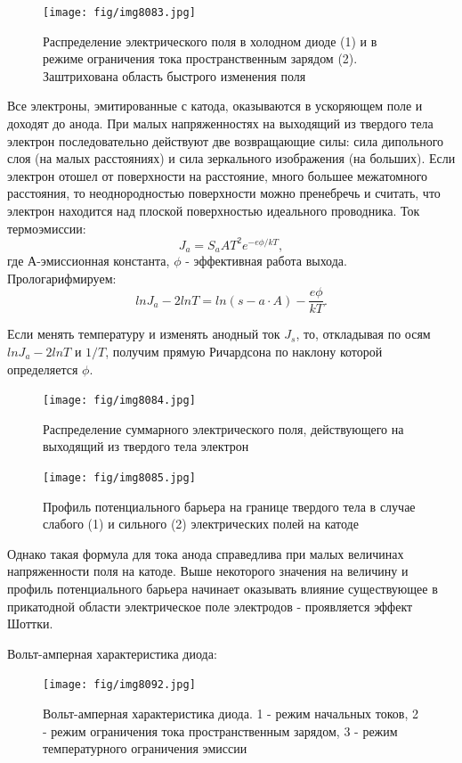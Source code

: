 \begin{figure}[h!]
    \centering
    \texttt{[image: fig/img8083.jpg]}
    \caption{Распределение электрического поля в холодном диоде (1) и в режиме ограничения тока пространственным зарядом (2). Заштрихована область быстрого изменения поля}
    \label{fig:6}
\end{figure}

Все электроны, эмитированные с катода, оказываются в ускоряющем поле и доходят до анода. При малых напряженностях на выходящий из твердого тела электрон последовательно действуют две возвращающие силы: сила дипольного слоя (на малых расстояниях) и сила зеркального изображения (на больших). Если электрон отошел от поверхности на расстояние, много большее межатомного расстояния, то неоднородностью поверхности можно пренебречь и считать, что электрон находится над плоской поверхностью идеального проводника. 
Ток термоэмиссии:
\begin{equation}
J_a=S_a A T^2 e^{-e \phi /kT},
\end{equation}
где А-эмиссионная константа, $\phi$ - эффективная работа выхода. Прологарифмируем:
\begin{equation}
lnJ_a-2lnT=ln(s-a \cdot A)-\frac{e\phi}{kT}.
\end{equation}

Если менять температуру и изменять анодный ток $J_s$, то, откладывая по осям $lnJ_a-2lnT$ и $1/T$, получим прямую Ричардсона по наклону которой определяется $\phi$.

\begin{figure}[H]
    \centering
    \texttt{[image: fig/img8084.jpg]}
    \caption{Распределение суммарного электрического поля, действующего на выходящий из твердого тела электрон}
    \label{fig:7}
\end{figure}

\begin{figure}[h!]
    \centering
    \texttt{[image: fig/img8085.jpg]}
    \caption{Профиль потенциального барьера на границе твердого тела в случае слабого (1) и сильного (2) электрических полей на катоде}
    \label{fig:8}
\end{figure}

Однако такая формула для тока анода справедлива при малых величинах напряженности поля на катоде. Выше некоторого значения на величину и профиль потенциального барьера начинает оказывать влияние существующее в прикатодной области электрическое поле электродов - проявляется эффект Шоттки. 

Вольт-амперная характеристика диода:
 \begin{figure}[h!]
    \centering
    \texttt{[image: fig/img8092.jpg]}
    \caption{Вольт-амперная характеристика диода. 1 - режим начальных токов, 2 - режим ограничения тока пространственным зарядом, 3 - режим температурного ограничения эмиссии}
    \label{fig:9}
\end{figure}


